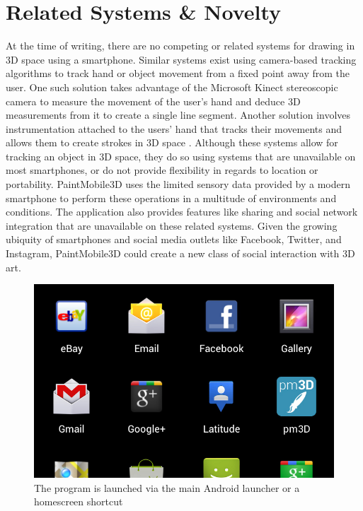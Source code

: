 \documentclass{chi-ext}
\begin{document}
\section{Related Systems \& Novelty}

At the time of writing, there are no competing or related systems for drawing in 3D space using a smartphone. Similar systems exist using camera-based tracking algorithms to track hand or object movement from a fixed point away from the user. One such solution takes advantage of the Microsoft Kinect stereoscopic camera to measure the movement of the user’s hand and deduce 3D measurements from it to create a single line segment. Another solution involves instrumentation attached to the users' hand that tracks their movements and allows them to create strokes in 3D space \cite{schkolne2002drawing}. Although these systems allow for tracking an object in 3D space, they do so using systems that are unavailable on most smartphones, or do not provide flexibility in regards to location or portability. PaintMobile3D uses the limited sensory data provided by a modern smartphone to perform these operations in a multitude of environments and conditions. The application also provides features like sharing and social network integration that are unavailable on these related systems. Given the growing ubiquity of smartphones and social media outlets like Facebook, Twitter, and Instagram, PaintMobile3D could create a new class of social interaction with 3D art.

\begin{figure}
\parbox{\columnwidth}{
  \centering
  \includegraphics[width=\columnwidth]{icon.jpg}
  \caption{The program is launched via the main Android launcher or a homescreen shortcut}
  \label{fig:icon}
}
\end{figure}
\end{document}
